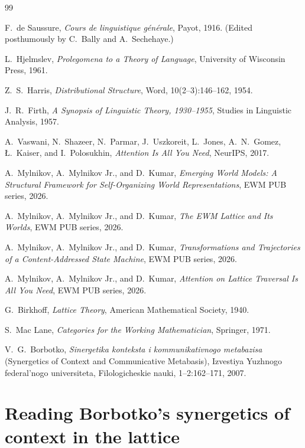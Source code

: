 \documentclass[11pt,a4paper]{article}
\theoremstyle{remark}
\begin{document}
\begin{thebibliography}{99}

 F.~de Saussure,
\textit{Cours de linguistique g\'en\'erale}, Payot, 1916.
(Edited posthumously by C.~Bally and A.~Sechehaye.)

 L.~Hjelmslev,
\textit{Prolegomena to a Theory of Language}, University of Wisconsin Press,
1961.

 Z.~S.~Harris,
\textit{Distributional Structure}, Word, 10(2--3):146--162, 1954.

 J.~R.~Firth,
\textit{A Synopsis of Linguistic Theory, 1930--1955}, Studies in Linguistic
Analysis, 1957.

 A.~Vaswani, N.~Shazeer, N.~Parmar, J.~Uszkoreit,
L.~Jones, A.~N.~Gomez, \L.~Kaiser, and I.~Polosukhin,
\textit{Attention Is All You Need}, NeurIPS, 2017.

 A.~Mylnikov, A.~Mylnikov Jr., and D.~Kumar,
\textit{Emerging World Models: A Structural Framework for Self-Organizing
World Representations}, EWM PUB series, 2026.

 A.~Mylnikov, A.~Mylnikov Jr., and D.~Kumar,
\textit{The EWM Lattice and Its Worlds}, EWM PUB series, 2026.

 A.~Mylnikov, A.~Mylnikov Jr., and D.~Kumar,
\textit{Transformations and Trajectories of a Content-Addressed State
Machine}, EWM PUB series, 2026.

 A.~Mylnikov, A.~Mylnikov Jr., and D.~Kumar,
\textit{Attention on Lattice Traversal Is All You Need}, EWM PUB series, 2026.

 G.~Birkhoff,
\textit{Lattice Theory}, American Mathematical Society, 1940.

 S.~Mac Lane,
\textit{Categories for the Working Mathematician}, Springer, 1971.

 V.~G.~Borbotko,
\textit{Sinergetika konteksta i kommunikativnogo metabazisa} (Synergetics of
Context and Communicative Metabasis), Izvestiya Yuzhnogo federal'nogo
universiteta, Filologicheskie nauki, 1--2:162--171, 2007.

\end{thebibliography}

\appendix
\section{Reading Borbotko's synergetics of context in the lattice}
\label{app:borbotko}
\end{document}
